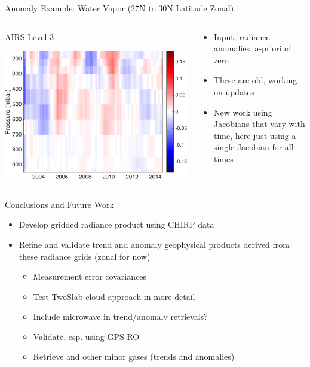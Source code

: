 \documentclass[10pt,t]{beamer}
\begin{document}
\begin{frame}[label={sec:org7644cff}]{Anomaly Example: Water Vapor (27N to 30N Latitude Zonal)}
\vspace{-0.15in}
\begin{columns}
\begin{column}{0.55\columnwidth}
\begin{block}{\footnotesize AIRS Level 3}
\vspace{-0.1in}
\begin{center}
\includegraphics[width=0.8\linewidth]{./oFigs/water_lati_30_L3.png}
\end{center}
\end{block}
\end{column}

\begin{column}{0.55\columnwidth}
\begin{block}{\footnotesize}
\small
\begin{itemize}
\item Input: radiance anomalies, a-priori of zero
\item These are old, working on updates
\item New work using Jacobians that vary with time, here just using a single Jacobian for all times
\end{itemize}
\end{block}
\end{column}
\end{columns}
\end{frame}

\begin{frame}[label={sec:orgd1d7f12}]{Conclusions and Future Work}
\begin{itemize}
\item Develop gridded radiance product using CHIRP data
\item Refine and validate trend and anomaly geophysical products derived from these radiance grids (zonal for now)
\begin{itemize}
\item Measurement error covariances
\item Test TwoSlab cloud approach in more detail
\item Include microwave in trend/anomaly retrievals?
\item Validate, esp. using GPS-RO
\item Retrieve \cd and other minor gases (trends and anomalies)
\end{itemize}
\end{itemize}
\end{frame}
\end{document}

